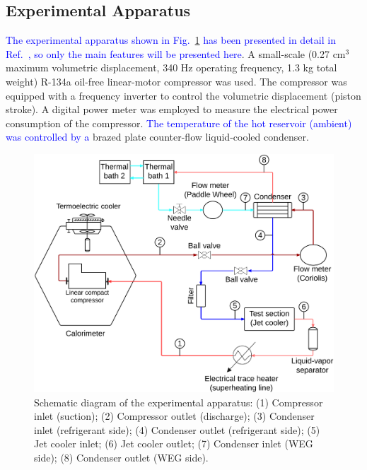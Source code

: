 \documentclass[review,preprint,12pt]{elsarticle}
\begin{document}
\subsection{Experimental Apparatus}
\label{sec:Experimental_Apparatus}

\textcolor{blue}{The experimental apparatus shown in Fig.~\ref{fig:Figure_1} has been presented in detail in Ref.~\cite{OliveiraBarbosaJr.2016}, so only the main features will be presented here}. A small-scale (0.27 cm$^{3}$ maximum volumetric displacement, 340 Hz operating frequency, 1.3 kg total weight) R-134a oil-free linear-motor compressor was used. The compressor was equipped with a frequency inverter to control the volumetric displacement (piston stroke). A digital power meter was employed to measure the electrical power consumption of the compressor.  %
\textcolor{blue}{The temperature of the hot reservoir (ambient) was controlled by a} brazed plate counter-flow liquid-cooled condenser.

\begin{figure}[htp!]
\centering
\includegraphics[angle=0,scale=0.4]{Figure_1.png}
\caption{Schematic diagram of the experimental apparatus: (1) Compressor inlet (suction); (2) Compressor outlet (discharge); (3) Condenser inlet (refrigerant side); (4) Condenser outlet (refrigerant side); (5) Jet cooler inlet; (6) Jet cooler outlet; (7) Condenser inlet (WEG side); (8) Condenser outlet (WEG side).}
\label{fig:Figure_1}
\end{figure}
\end{document}
